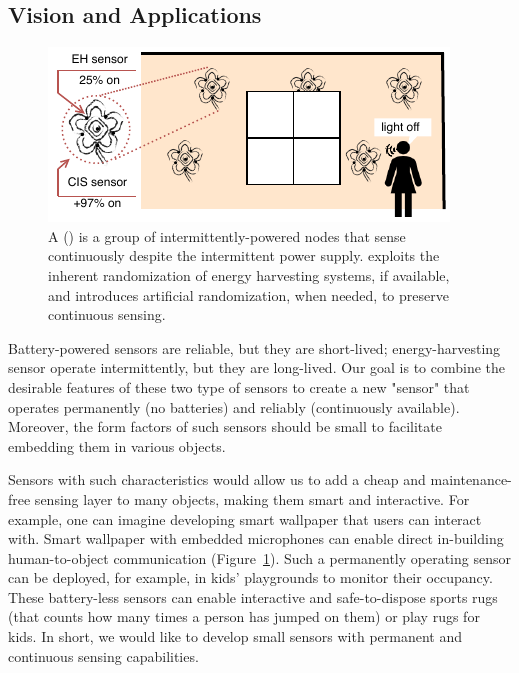 \subsection{Vision and Applications}
%
\begin{figure}[t]
	\centering
	\includegraphics[width=\columnwidth]{figures/smart_fabric}
	\caption{A \fullsys (\sys) is a group of intermittently-powered nodes that sense continuously despite the intermittent power supply. \sys exploits the inherent randomization of energy harvesting systems, if available, and introduces artificial randomization, when needed, to preserve continuous sensing.
	}
	\label{fig:smart_fabric}
\end{figure}
%
Battery-powered sensors are reliable, but they are short-lived; energy-harvesting sensor operate intermittently, but they are long-lived. Our goal is to combine the desirable features of these two type of sensors to 
create a new "sensor" that operates permanently (no batteries) and reliably (continuously available).
Moreover, the form factors of such sensors should be small to facilitate embedding them in various objects. 

Sensors with such characteristics would allow us to add a cheap and maintenance-free sensing layer to many objects, making them smart and interactive. 
For example, one can imagine developing smart wallpaper that users can interact with. 
Smart wallpaper with embedded microphones can enable direct in-building human-to-object communication (Figure~\ref{fig:smart_fabric}). Such a permanently operating sensor can be deployed, for example, in kids' playgrounds to monitor their occupancy. These battery-less sensors can enable
 interactive and safe-to-dispose sports rugs (that counts how many times a person has jumped on them) or play rugs for kids.
In short, we would like to develop small sensors with permanent and continuous sensing capabilities.  



